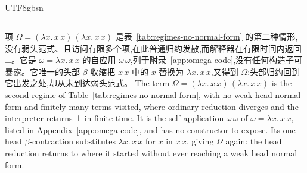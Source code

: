 \begin{CJK*}{UTF8}{gbsn}
  \subsection{}\label{sec:application-bottom}

  \ifPaperChinese
  项 $\Omega = (\lambda x.\,x\,x)\,(\lambda x.\,x\,x)$ 是表~\ref{tab:regimes-no-normal-form} 的第二种情形,没有弱头范式、且访问有限多个项,在此普通归约发散,而解释器在有限时间内返回 $\bot$。它是 $\omega = \lambda x.\,x\,x$ 的自应用 $\omega\,\omega$,列于附录~\ref{app:omega-code},没有任何构造子可暴露。它唯一的头部 $\beta$-收缩把 $x\,x$ 中的 $x$ 替换为 $\lambda x.\,x\,x$,又得到 $\Omega$:头部归约回到它出发之处,却从未到达弱头范式。
  \else
  The term $\Omega = (\lambda x.\,x\,x)\,(\lambda x.\,x\,x)$ is the second regime of Table~\ref{tab:regimes-no-normal-form}, with no weak head normal form and finitely many terms visited, where ordinary reduction diverges and the interpreter returns $\bot$ in finite time. It is the self-application $\omega\,\omega$ of $\omega = \lambda x.\,x\,x$, listed in Appendix~\ref{app:omega-code}, and has no constructor to expose. Its one head $\beta$-contraction substitutes $\lambda x.\,x\,x$ for $x$ in $x\,x$, giving $\Omega$ again: the head reduction returns to where it started without ever reaching a weak head normal form.
  \fi


\end{CJK*}
